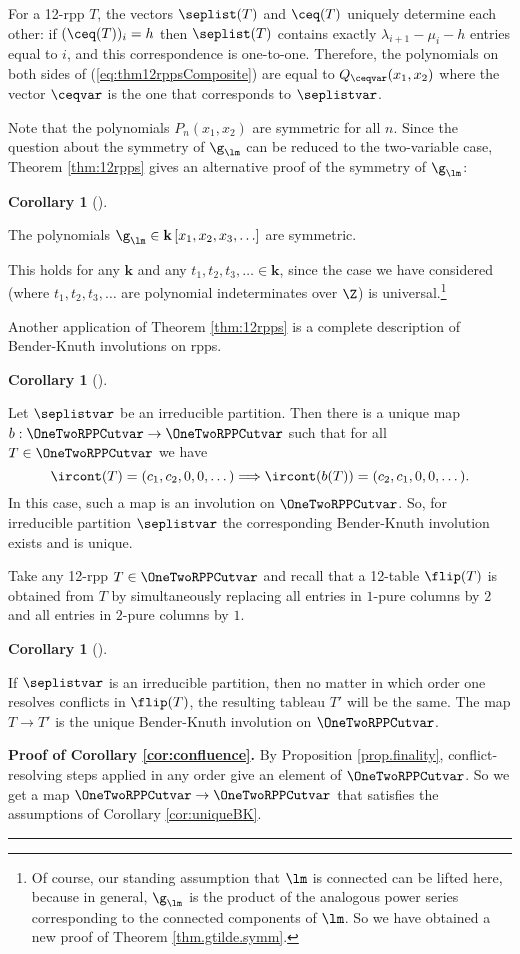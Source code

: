 \documentclass[numbers=enddot,12pt,final,onecolumn,notitlepage]{scrartcl}%
\theoremstyle{definition}
\newtheorem{coro}[theo]{Corollary}
\newenvironment{corollary}[1][]
{\begin{coro}[#1]\begin{leftbar}}
{\end{leftbar}\end{coro}}
\newenvironment{proof}[1][Proof]{\noindent\textbf{#1.} }{\ \rule{0.5em}{0.5em}}
\newcommand{\kk}{\mathbf{k}}
\begin{document}
 For a 12-rpp $T$, the vectors $\seplist(T)$ and $\ceq(T)$ uniquely determine each other: if $(\ceq(T))_i=h$ then $\seplist(T)$ contains exactly $\lambda_{i+1}-\mu_i-h$ entries equal to $i$, and this correspondence is one-to-one. Therefore, the polynomials on both sides of (\ref{eq:thm12rppsComposite}) are equal to $Q_{\ceqvar}(x_1,x_2)$ where the vector $\ceqvar$ is the one that corresponds to $\seplistvar$.

 Note that the polynomials $P_n(x_1,x_2)$ are symmetric for all $n$. Since the question about the symmetry of $\g_\lm$ can be reduced to the two-variable case, Theorem \ref{thm:12rpps} gives an alternative proof of the symmetry of $\g_\lm$:
\begin{corollary}
 The polynomials $\g_\lm \in \kk\left[x_1, x_2, x_3, \ldots\right]$ are symmetric.
\end{corollary}
 This holds for any $\kk$ and any $t_1, t_2, t_3, \ldots \in \kk$, since the case we have considered (where $t_1, t_2, t_3, \ldots$ are polynomial indeterminates over $\Z$) is universal.\footnote{Of course, our standing assumption that $\lm$ is connected can be lifted here, because in general, $\g_\lm$ is the product of the analogous power series corresponding to the connected components of $\lm$. So we have obtained a new proof of Theorem \ref{thm.gtilde.symm}.}

Another application of Theorem \ref{thm:12rpps} is a complete description of Bender-Knuth involutions on rpps.

\begin{corollary}
\label{cor:uniqueBK}
Let $\seplistvar$ be an irreducible partition. Then there is a unique map $b:\OneTwoRPPCutvar\to\OneTwoRPPCutvar$ such that for all $T\in\OneTwoRPPCutvar$ we have 
$$\ircont(T)=(c_1,c_2,0,0,\dots)\Longrightarrow \ircont(b(T))=(c_2,c_1,0,0,\dots).$$
In this case, such a map is an involution on $\OneTwoRPPCutvar$. So, for irreducible partition $\seplistvar$ the corresponding Bender-Knuth involution exists and is unique.
\end{corollary}

Take any 12-rpp $T\in\OneTwoRPPCutvar$ and recall that a 12-table $\flip(T)$ is obtained from $T$ by simultaneously replacing all entries in $1$-pure columns by $2$ and all entries in $2$-pure columns by $1$. 

\begin{corollary}
\label{cor:confluence}
 If $\seplistvar$ is an irreducible partition, then no matter in which order one resolves conflicts in $\flip(T)$, the resulting tableau $T'$ will be the same. The map $T\to T'$ is the unique Bender-Knuth involution on $\OneTwoRPPCutvar$.
\end{corollary}
\begin{proof}[Proof of Corollary \ref{cor:confluence}]
 By Proposition \ref{prop.finality}, conflict-resolving steps applied in any order give an element of $\OneTwoRPPCutvar$. So we get a map $\OneTwoRPPCutvar\to \OneTwoRPPCutvar$ that satisfies the assumptions of Corollary \ref{cor:uniqueBK}.
\end{proof}
\end{document}
